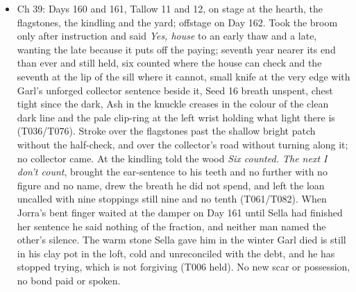 \documentclass{design/chronicle}
\begin{document}
{\begin{itemize}[leftmargin=1.4em,itemsep=1pt,topsep=3pt,parsep=0pt]
\item Ch 39: Days 160 and 161, Tallow 11 and 12, on stage at the hearth, the flagstones, the kindling and the yard; offstage on Day 162. Took the broom only after instruction and said \emph{Yes, house} to an early thaw and a late, wanting the late because it puts off the paying; seventh year nearer its end than ever and still held, six counted where the house can check and the seventh at the lip of the sill where it cannot, small knife at the very edge with Garl’s unforged collector sentence beside it, Seed 16 breath unspent, chest tight since the dark, Ash in the knuckle creases in the colour of the clean dark line and the pale clip-ring at the left wrist holding what light there is (T036/T076). Stroke over the flagstones past the shallow bright patch without the half-check, and over the collector’s road without turning along it; no collector came. At the kindling told the wood \emph{Six counted. The next I don’t count}, brought the ear-sentence to his teeth and no further with no figure and no name, drew the breath he did not spend, and left the loan uncalled with nine stoppings still nine and no tenth (T061/T082). When Jorra’s bent finger waited at the damper on Day 161 until Sella had finished her sentence he said nothing of the fraction, and neither man named the other’s silence. The warm stone Sella gave him in the winter Garl died is still in his clay pot in the loft, cold and unreconciled with the debt, and he has stopped trying, which is not forgiving (T006 held). No new scar or possession, no bond paid or spoken.

\end{itemize}

\begin{itemize}[leftmargin=1.4em,itemsep=1pt,topsep=3pt,parsep=0pt]


\end{itemize}}
\end{document}
